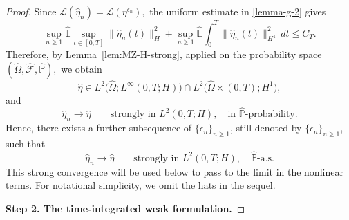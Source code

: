 \documentclass[11pt]{article}
\theoremstyle{plain}
\numberwithin{equation}{section}
\begin{document}
\begin{proof}
Since \(\mathcal L(\widehat\eta_n)=\mathcal L(\eta^{\epsilon_n}),\) the uniform estimate in \eqref{lemma-g-2} gives
\[
\sup_{n\ge1}\widehat{\mathbb E}\sup_{t\in[0,T]}\|\widehat\eta_n(t)\|_H^2+\sup_{n\ge1}
\widehat{\mathbb E}\int_0^T\|\widehat\eta_n(t)\|_{H^1}^2\,dt \le C_T .
\]
Therefore, by Lemma~\ref{lem:MZ-H-strong}, applied on the probability space \((\widehat\Omega,\widehat{\mathcal F},\widehat{\mathbb P}),\)
we obtain
\[
\widehat\eta \in L^2\bigl(\widehat\Omega;L^\infty(0,T;H)\bigr) \cap L^2\bigl(\widehat\Omega\times(0,T);H^1\bigr),
\]
and
\[
\widehat\eta_n\to\widehat\eta \qquad \text{strongly in }L^2(0,T;H), \quad \text{in }\widehat{\mathbb P}\text{-probability}.
\]
Hence,
there exists a further subsequence of \(\{\epsilon_n\}_{n\ge1}\), still
denoted by \(\{\epsilon_n\}_{n\ge1}\), such that
\[
\widehat\eta_n\to\widehat\eta \qquad \text{strongly in }L^2(0,T;H),\quad \widehat{\mathbb P}\text{-a.s.}
\]
This strong convergence will be used below to pass to the limit in the
nonlinear terms. For notational simplicity, we omit the hats in the sequel.


\medskip
\noindent\textbf{Step 2. The time-integrated weak formulation.}


\end{proof}
\end{document}
